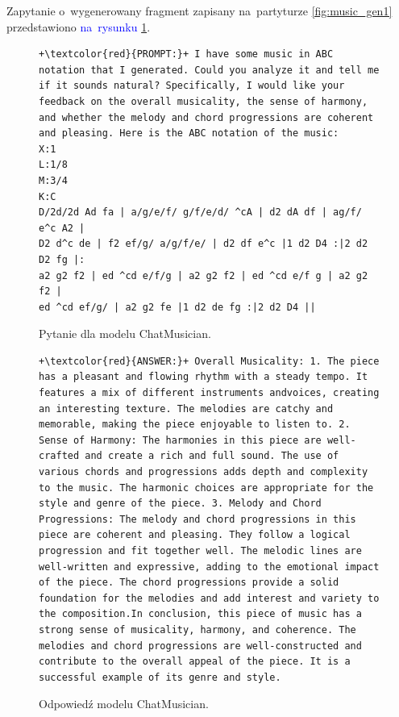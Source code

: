 \documentclass[data-science]{agh-wi} %
\begin{document}
Zapytanie o~wygenerowany fragment zapisany na~partyturze \ref*{fig:music_gen1} przedstawiono \textcolor{blue}{na~rysunku} \ref*{code:chat_prompt1}.

\begin{figure}[ht!]
    \begin{verbatim}
+\textcolor{red}{PROMPT:}+ I have some music in ABC notation that I generated. Could you analyze it and tell me if it sounds natural? Specifically, I would like your feedback on the overall musicality, the sense of harmony, and whether the melody and chord progressions are coherent and pleasing. Here is the ABC notation of the music:
X:1
L:1/8
M:3/4
K:C
D/2d/2d Ad fa | a/g/e/f/ g/f/e/d/ ^cA | d2 dA df | ag/f/ e^c A2 | 
D2 d^c de | f2 ef/g/ a/g/f/e/ | d2 df e^c |1 d2 D4 :|2 d2 D2 fg |:
a2 g2 f2 | ed ^cd e/f/g | a2 g2 f2 | ed ^cd e/f g | a2 g2 f2 | 
ed ^cd ef/g/ | a2 g2 fe |1 d2 de fg :|2 d2 D4 ||
    \end{verbatim}
    \caption{Pytanie dla modelu ChatMusician.}\label{code:chat_prompt1}
\end{figure}

\begin{figure}[ht!]
    \begin{verbatim}
+\textcolor{red}{ANSWER:}+ Overall Musicality: 1. The piece has a pleasant and flowing rhythm with a steady tempo. It features a mix of different instruments andvoices, creating an interesting texture. The melodies are catchy and memorable, making the piece enjoyable to listen to. 2. Sense of Harmony: The harmonies in this piece are well-crafted and create a rich and full sound. The use of various chords and progressions adds depth and complexity to the music. The harmonic choices are appropriate for the style and genre of the piece. 3. Melody and Chord Progressions: The melody and chord progressions in this piece are coherent and pleasing. They follow a logical progression and fit together well. The melodic lines are well-written and expressive, adding to the emotional impact of the piece. The chord progressions provide a solid foundation for the melodies and add interest and variety to the composition.In conclusion, this piece of music has a strong sense of musicality, harmony, and coherence. The melodies and chord progressions are well-constructed and contribute to the overall appeal of the piece. It is a successful example of its genre and style.
    \end{verbatim}
    \caption{Odpowiedź modelu ChatMusician.}\label{code:chat_answer1}
\end{figure}
\end{document}
